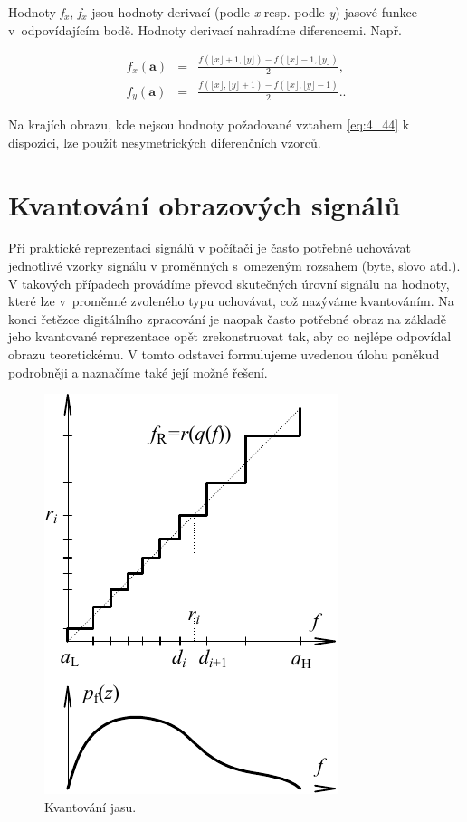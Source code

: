 Hodnoty \textit{f}$_x$, \textit{f}$_x$ jsou hodnoty derivací (podle \textit{x} resp. podle \textit{y}) jasové funkce v~odpovídajícím bodě. Hodnoty derivací nahradíme diferencemi. Např.

\begin{eqnarray} \label{eq:4_44}
    f_x(\mathbf{a}) &=& \frac{f(\lfloor x \rfloor + 1, \lfloor y \rfloor) - f(\lfloor x \rfloor - 1, \lfloor y \rfloor)}{2},\\
    f_y(\mathbf{a}) &=& \frac{f(\lfloor x \rfloor, \lfloor y \rfloor + 1) - f(\lfloor x \rfloor, \lfloor y \rfloor - 1)}{2}. \nonumber
. \nonumber
\end{eqnarray}

Na krajích obrazu, kde nejsou hodnoty požadované vztahem \eqref{eq:4_44} k dispozici, lze použít nesymetrických diferenčních vzorců.

\noindent 

\section*{Kvantování obrazových signálů}

Při praktické reprezentaci signálů v počítači je často potřebné uchovávat jednotlivé vzorky signálu v proměnných s~omezeným rozsahem (byte, slovo atd.). V takových případech provádíme převod skutečných úrovní signálu na hodnoty, které lze v~proměnné zvoleného typu uchovávat, což nazýváme kvantováním. Na konci řetězce digitálního zpracování je naopak často potřebné obraz na základě jeho kvantované reprezentace opět zrekonstruovat tak, aby co nejlépe odpovídal obrazu teoretickému. V tomto odstavci formulujeme uvedenou úlohu poněkud podrobněji a naznačíme také její možné řešení.

\begin{figure}[th]
    \begin{center}
        \includegraphics[scale=1.0]{04_digitalizace/images/img_4_10.pdf}
    \end{center}
    \caption{Kvantování jasu.}
    \label{img:4_10}
\end{figure}

